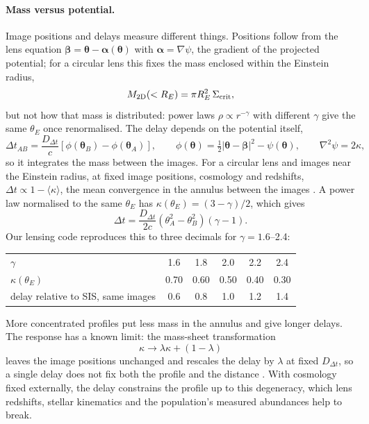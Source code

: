 \documentclass[11pt,a4paper]{article}
\newcommand{\scrit}{\Sigma_{\rm crit}}
\begin{document}
\paragraph{Mass versus potential.} Image positions and delays measure different things. Positions follow from the lens equation $\boldsymbol\beta=\boldsymbol\theta-\boldsymbol\alpha(\boldsymbol\theta)$ with $\boldsymbol\alpha=\nabla\psi$, the gradient of the projected potential; for a circular lens this fixes the mass enclosed within the Einstein radius,
\begin{equation}
M_{\rm 2D}(<R_E)=\pi R_E^2\,\scrit ,
\end{equation}
but not how that mass is distributed: power laws $\rho\propto r^{-\gamma}$ with different $\gamma$ give the same $\theta_E$ once renormalised. The delay depends on the potential itself,
\begin{equation}
\Delta t_{AB}=\frac{D_{\Delta t}}{c}\left[\phi(\boldsymbol\theta_B)-\phi(\boldsymbol\theta_A)\right],\qquad
\phi(\boldsymbol\theta)=\tfrac12|\boldsymbol\theta-\boldsymbol\beta|^2-\psi(\boldsymbol\theta),\qquad
\nabla^2\psi=2\kappa ,
\end{equation}
so it integrates the mass between the images. For a circular lens and images near the Einstein radius, at fixed image positions, cosmology and redshifts, $\Delta t\propto1-\langle\kappa\rangle$, the mean convergence in the annulus between the images \citep{Kochanek2002}. A power law normalised to the same $\theta_E$ has $\kappa(\theta_E)=(3-\gamma)/2$, which gives
\begin{equation}
\Delta t=\frac{D_{\Delta t}}{2c}\left(\theta_A^2-\theta_B^2\right)(\gamma-1).
\end{equation}
Our lensing code reproduces this to three decimals for $\gamma=1.6$--2.4:

\begin{center}
\begin{tabular}{lccccc}
\toprule
$\gamma$ & 1.6 & 1.8 & 2.0 & 2.2 & 2.4 \\
$\kappa(\theta_E)$ & 0.70 & 0.60 & 0.50 & 0.40 & 0.30 \\
delay relative to SIS, same images & 0.6 & 0.8 & 1.0 & 1.2 & 1.4 \\
\bottomrule
\end{tabular}
\end{center}

More concentrated profiles put less mass in the annulus and give longer delays. The response has a known limit: the mass-sheet transformation
\begin{equation}
\kappa\to\lambda\kappa+(1-\lambda)
\end{equation}
leaves the image positions unchanged and rescales the delay by $\lambda$ at fixed $D_{\Delta t}$, so a single delay does not fix both the profile and the distance \citep{Sonnenfeld2018}. With cosmology fixed externally, the delay constrains the profile up to this degeneracy, which lens redshifts, stellar kinematics and the population's measured abundances help to break.
\end{document}
